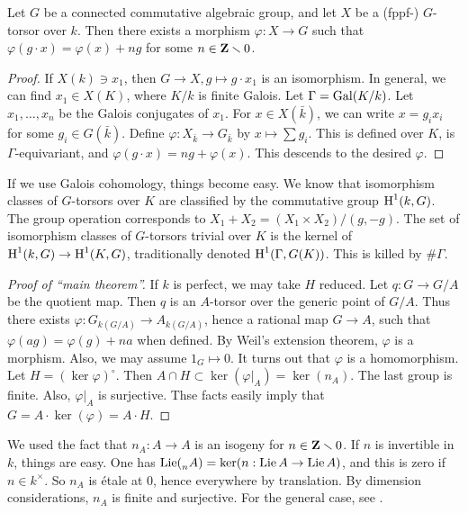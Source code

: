 \begin{prop}
Let $G$ be a connected commutative algebraic group, and let $X$ be a (fppf-) 
$G$-torsor over $k$. Then there exists a morphism 
$\varphi:X\to G$ such that $\varphi(g\cdot x)=\varphi(x)+n g$ for some 
$n\in \mathbf{Z}\smallsetminus 0$. 
\end{prop}
\begin{proof}
If $X(k) \ni x_1$, then $G\to X,g\mapsto g\cdot x_1$ is an isomorphism. In 
general, we can find $x_1\in X(K)$, where $K/k$ is finite Galois. Let 
$\Gamma=\operatorname{Gal}(K/k)$. Let $x_1,\dots,x_n$ be the Galois conjugates of $x_1$. 
For $x\in X(\bar k)$, we can write $x=g_i x_i$ for some $g_i\in G(\bar k)$. 
Define $\varphi:X_{\bar k} \to G_{\bar k}$ by $x\mapsto \sum g_i$. This is 
defined over $K$, is $\Gamma$-equivariant, and 
$\varphi(g\cdot x)=n g+ \varphi(x)$. This descends to the desired $\varphi$. 
\end{proof}

If we use Galois cohomology, things become easy. We know that isomorphism 
classes of $G$-torsors over $K$ are classified by the commutative group 
$\operatorname{H}^1(k,G)$. The group operation corresponds to 
$X_1+X_2 = (X_1\times X_2)/(g,-g)$. The set of isomorphism classes of 
$G$-torsors trivial over $K$ is the kernel of 
$\operatorname{H}^1(k,G) \to \operatorname{H}^1(K,G)$, traditionally denoted $\operatorname{H}^1(\Gamma,G(K))$. This is 
killed by $\# \Gamma$. 

\begin{proof}[Proof of ``main theorem'']
If $k$ is perfect, we may take $H$ reduced. Let $q:G\to G/A$ be the quotient 
map. Then $q$ is an $A$-torsor over the generic point of $G/A$. Thus there 
exists $\varphi:G_{k(G/A)} \to A_{k(G/A)}$, hence a rational map 
$G\to A$, such that $\varphi(a g)=\varphi(g)+n a$ when defined. By Weil's 
extension theorem, $\varphi$ is a morphism. Also, we may assume $1_G \mapsto 0$. 
It turns out that $\varphi$ is a homomorphism. Let $H=(\ker\varphi)^\circ$. Then 
$A\cap H\subset \ker(\varphi|_A) = \ker(n_A)$. The last group is finite. 
Also, $\varphi|_A$ is surjective. Thse facts easily imply that 
$G=A\cdot \ker(\varphi) = A\cdot H$. 
\end{proof}

We used the fact that $n_A:A\to A$ is an isogeny for $n\in \mathbf{Z}\smallsetminus 0$. 
If $n$ is invertible in $k$, things are easy. One has 
$\operatorname{Lie}(\prescript{}{n}{A}) = \ker(n:\operatorname{Lie} A\to \operatorname{Lie} A)$, and this is zero if 
$n\in k^\times$. So $n_A$ is \'etale at $0$, hence everywhere by translation. 
By dimension considerations, $n_A$ is finite and surjective. For the general 
case, see \cite{m08}. 




